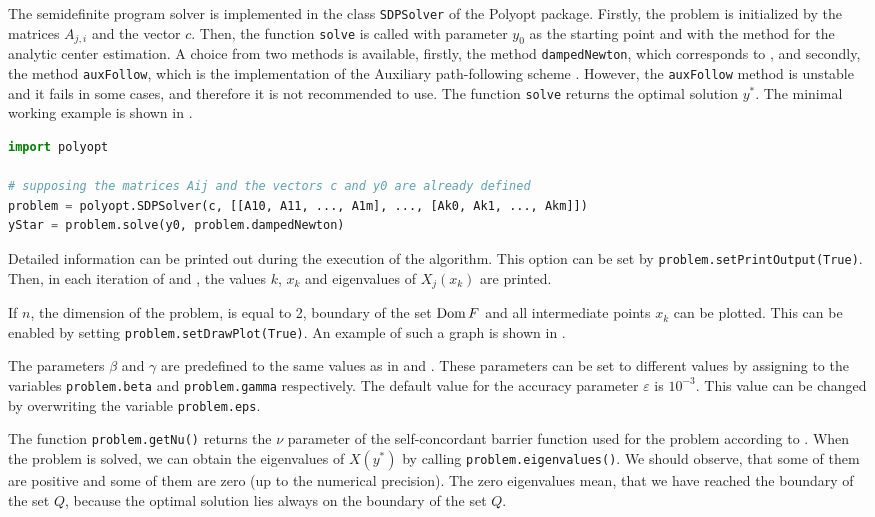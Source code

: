 The semidefinite program solver is implemented in the class \texttt{SDPSolver} of the Polyopt package. Firstly, the problem is initialized by the matrices $A_{j,i}$ and the vector $c$.
Then, the function \texttt{solve} is called with parameter $y_0$ as the starting point and with the method for the analytic center estimation.
A choice from two methods is available, firstly, the method \texttt{dampedNewton}, which corresponds to , and secondly, the method \texttt{auxFollow}, which is the implementation of the Auxiliary path-following scheme \cite{Nesterov-2004}. 
However, the \texttt{auxFollow} method is unstable and it fails in some cases, and therefore it is not recommended to use.
The function \texttt{solve} returns the optimal solution $y^*$.
The minimal working example is shown in .
\begin{lstlisting}[language=python, caption={Typical usage of the class \texttt{SDPSolver} of the Polyopt package.}, labellis={SDP:imp:usage}]
import polyopt

# supposing the matrices Aij and the vectors c and y0 are already defined
problem = polyopt.SDPSolver(c, [[A10, A11, ..., A1m], ..., [Ak0, Ak1, ..., Akm]])
yStar = problem.solve(y0, problem.dampedNewton)
\end{lstlisting}

Detailed information can be printed out during the execution of the algorithm.
This option can be set by \texttt{problem.setPrintOutput(True)}.
Then, in each iteration of  and , the values $k$, $x_k$ and eigenvalues of $X_j(x_k)$ are printed.

If $n$, the dimension of the problem, is equal to 2, boundary of the set $\operatorname{Dom} F$  and all intermediate points $x_k$ can be plotted.
This can be enabled by setting \texttt{problem.setDrawPlot(True)}.
An example of such a graph is shown in .

The parameters $\beta$ and $\gamma$ are predefined to the same values as in  and .
These parameters can be set to different values by assigning to the variables \texttt{problem.beta} and \texttt{problem.gamma} respectively.
The default value for the accuracy parameter $\varepsilon$ is $10^{-3}$.
This value can be changed by overwriting the variable \texttt{problem.eps}.

The function \texttt{problem.getNu()} returns the $\nu$ parameter of the self-concordant barrier function used for the problem according to .
When the problem is solved, we can obtain the eigenvalues of $X(y^*)$ by calling \texttt{problem.eigenvalues()}.
We should observe, that some of them are positive and some of them are zero (up to the numerical precision).
The zero eigenvalues mean, that we have reached the boundary of the set $Q$, because the optimal solution lies always on the boundary of the set $Q$.

